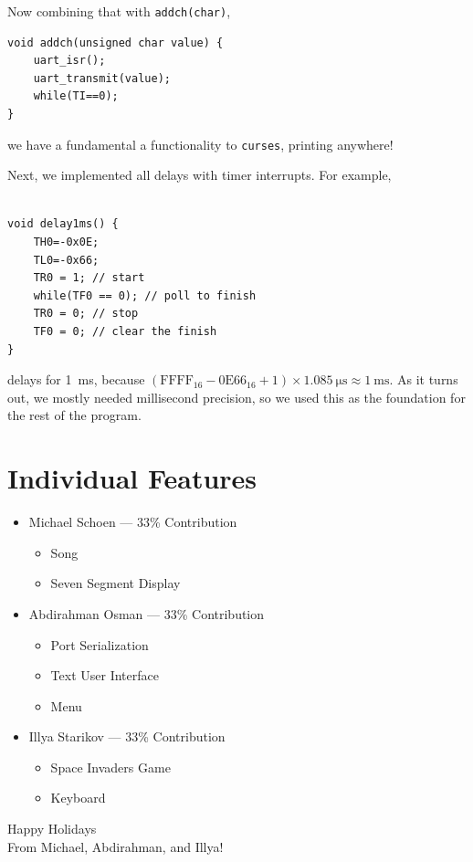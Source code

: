 \documentclass[12pt]{article}
\newcommand{\shellcmd}[1]{\texttt{\colorbox{gray!30}{#1}}}
\begin{document}
\noindent Now combining that with \shellcmd{addch(char)},

\begin{lstlisting}[style=cC]
void addch(unsigned char value) {
	uart_isr();
	uart_transmit(value);
	while(TI==0);
}
\end{lstlisting}

\noindent we have a fundamental a functionality to \shellcmd{curses}, printing anywhere!

Next, we implemented all delays with timer interrupts. For example,

\begin{lstlisting}[style=cC]

void delay1ms() {
	TH0=-0x0E;
    TL0=-0x66;
	TR0 = 1; // start
	while(TF0 == 0); // poll to finish
	TR0 = 0; // stop
	TF0 = 0; // clear the finish
}
\end{lstlisting}

\noindent delays for \SI{1}{\milli\second}, because $(\text{FFFF}_{16} - \text{0E66}_{16} + 1)\times\SI{1.085}{\micro\second} \approx \SI{1}{\milli\second}$. As it turns out, we mostly needed millisecond precision, so we used this as the foundation for the rest of the program.

\section{Individual Features}
\begin{itemize}
    \item Michael Schoen --- 33\% Contribution
    \begin{itemize}
        \item Song
        \item Seven Segment Display
    \end{itemize}

    \item Abdirahman Osman --- 33\% Contribution
    \begin{itemize}
        \item Port Serialization
        \item Text User Interface
        \item Menu
    \end{itemize}

    \item Illya Starikov --- 33\% Contribution
    \begin{itemize}
        \item Space Invaders Game
        \item Keyboard
    \end{itemize}
\end{itemize}

\centering
\Huge Happy Holidays \\ From Michael, Abdirahman, and Illya!
\end{document}
